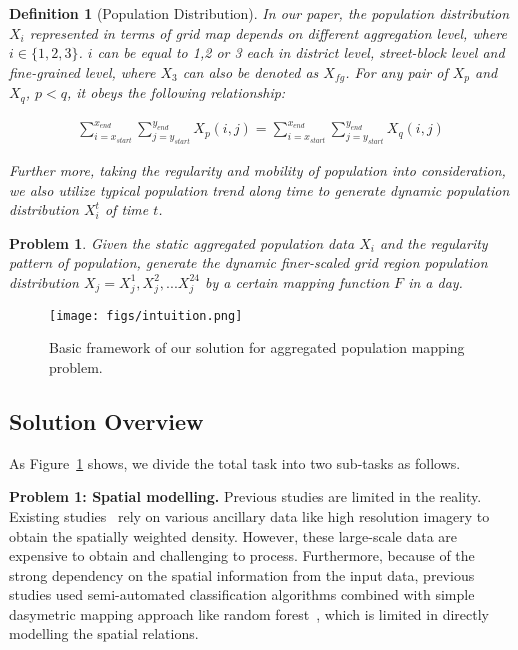 \documentclass[letterpaper]{article} %
\newtheorem{mdefinition}{Definition}
\newtheorem{problem}{Problem}
\begin{document}
\begin{mdefinition}[Population Distribution]
In our paper, the population distribution $X_{i}$ represented in terms of grid map depends on different aggregation level, where $i\in\{1,2,3\}$. $i$ can be equal to 1,2 or 3 each in district level, street-block level and fine-grained level, where $X_{3}$ can also be denoted as $X_{fg}$. For any pair of $X_{p}$ and $X_{q}$, $p<q$, it obeys the following relationship:

\begin{gather}
    \sum\limits_{i=x_{start}}^{x_{end}}\sum\limits_{j=y_{start}}^{y_{end}}X_{p}(i, j) = \sum\limits_{i=x_{start}}^{x_{end}}\sum\limits_{j=y_{start}}^{y_{end}}X_{q}(i, j)
\end{gather}

Further more, taking the regularity and mobility of population into consideration, we also utilize typical population trend along time to generate dynamic population distribution $X_{i}^t$ of time $t$.
\end{mdefinition}


\begin{problem}
Given the static aggregated population data $X_i$ and the regularity pattern of population, generate the dynamic finer-scaled grid region population distribution $X_{j}={X_{j}^{1},X_{j}^{2},...X_{j}^{24}}$ by a certain mapping function $F$ in a day.
\end{problem}

\begin{figure}[ht]
    \centering
    \texttt{[image: figs/intuition.png]}
    \caption{Basic framework of our solution for aggregated population mapping problem.}
    \label{fig:intuition}
\end{figure}

\subsection{Solution Overview}
As Figure~\ref{fig:intuition} shows, we divide the total task into two sub-tasks as follows.


\textbf{Problem 1: Spatial modelling.} Previous studies are limited in the reality. Existing studies~\cite{Gaughan2013HighRP,stevens2015disaggregating} rely on various ancillary data like high resolution imagery to obtain the spatially weighted density. However, these large-scale data are expensive to obtain and challenging to process. Furthermore, because of the strong dependency on the spatial information from the input data, previous studies used semi-automated classification algorithms combined with simple dasymetric mapping approach like random forest~\cite{stevens2015disaggregating}, which is limited in directly modelling the spatial relations. 
\end{document}
